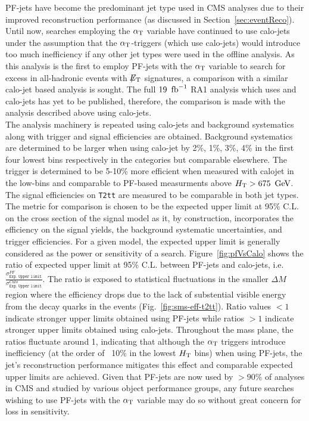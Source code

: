 PF-jets have become the predominant jet type used in CMS analyses due to their 
improved reconstruction performance (as discussed in Section~\ref{sec:eventReco}). 
Until now, searches employing the $\alpha_{\text{T}}$ variable have continued to use calo-jets 
under the assumption that the $\alpha_{\text{T}}$-triggers (which use calo-jets) would 
introduce too much inefficiency if any other jet types were used in the offline analysis.
As this analysis is the first to employ PF-jets with the $\alpha_{\text{T}}$ variable to search
for excess in all-hadronic events with $\mbox{$\not\!\!E_\text{T}$}$ signatures, a comparison with a similar 
calo-jet based analysis is sought. The full $19~\mbox{\ensuremath{\,\text{fb}^\text{$-$1}}}$ RA1 analysis which uses \alphat and 
calo-jets has yet to be published, therefore, the comparison is made with 
the analysis described above using calo-jets.\\
\indent The analysis machinery is repeated using calo-jets and background systematics along 
with trigger and signal efficiencies are obtained. Background systematics are determined to be 
larger when using calo-jet by 2\%, 1\%, 3\%, 4\% in the first four lowest \scalht bins respectively
in the \njethigh categories but comparable elsewhere. The \alphat trigger is determined
to be 5-10\% more efficient when measured with calojet in the low-\scalht bins and comparable to PF-based 
measurments above $\mbox{$H_\text{T}$} > 675~\,\text{Ge\hspace{-.08em}V}$.  The signal efficiencies on \texttt{T2tt} are measured to
be comparable in both jet types.\\  
\indent The metric for comparison is chosen to be the expected upper limit at 95\% C.L. on the cross section of the signal model  
as it, by construction, incorporates the efficiency on the signal yields, the background systematic 
uncertainties, and trigger efficiencies. For a given model, the expected upper limit is generally 
considered as the power or sensitivity of a search. Figure~\ref{fig:pfVsCalo} shows the ratio
of expected upper limit at 95\% C.L. between PF-jets and calo-jets, i.e. 
$\frac{\sigma_{\texttt{Exp. Upper limit}}^{PF}}{\sigma_{\texttt{Exp. Upper limit}}^{Calo}}$.
The ratio is exposed to statistical fluctuations in the smaller $\Delta M$ region where the efficiency
drops due to the lack of substential visible energy from the decay quarks in the events (Fig.~\ref{fig:sms-eff-t2tt}).
Ratio values $<1$ indicate stronger upper limits obtained using PF-jets while ratios $>1$ indicate
stronger upper limits obtained using calo-jets. Throughout the mass plane, the ratios 
fluctuate around 1, indicating that although the $\alpha_{\text{T}}$ triggers introduce inefficiency (at 
the order of ~10\% in the lowest $\mbox{$H_\text{T}$}$ bins) when using PF-jets, the jet's reconstruction 
performance mitigates this effect and comparable expected upper limits are achieved. Given that 
PF-jets are now used by $>90\%$ of analyses in CMS and studied by various object performance 
groups, any future searches wishing to use PF-jets with the $\alpha_{\text{T}}$ variable may do so without 
great concern for loss in sensitivity.  

